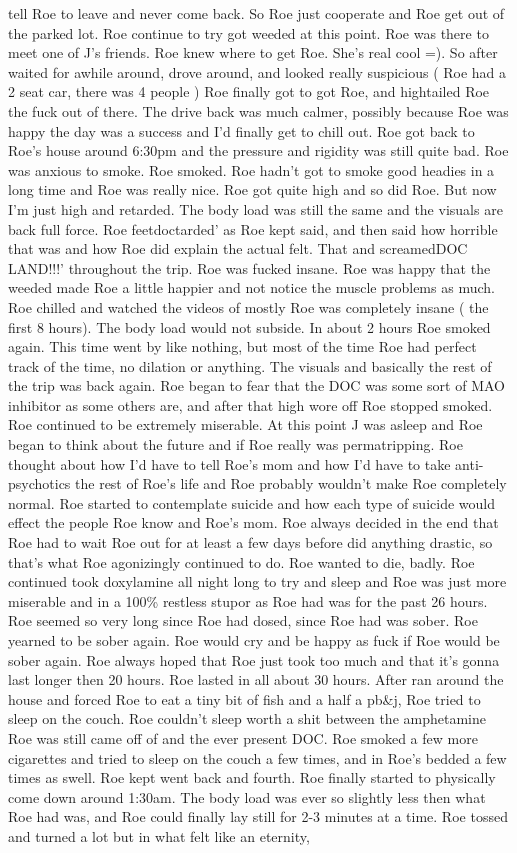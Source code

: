 \documentclass[12pt]{book}
\begin{document}
tell Roe to leave and never come back. So Roe just cooperate and Roe get out of the parked lot. Roe continue to try got weeded at this point. Roe was there to meet one of J's friends. Roe knew where to get Roe. She's real cool =). So after waited for awhile around, drove around, and looked really suspicious ( Roe had a 2 seat car, there was 4 people ) Roe finally got to got Roe, and hightailed Roe the fuck out of there. The drive back was much calmer, possibly because Roe was happy the day was a success and I'd finally get to chill out. Roe got back to Roe's house around 6:30pm and the pressure and rigidity was still quite bad. Roe was anxious to smoke. Roe smoked. Roe hadn't got to smoke good headies in a long time and Roe was really nice. Roe got quite high and so did Roe. But now I'm just high and retarded. The body load was still the same and the visuals are back full force. Roe feetdoctarded' as Roe kept said, and then said how horrible that was and how Roe did explain the actual felt. That and screamedDOC LAND!!!' throughout the trip. Roe was fucked insane. Roe was happy that the weeded made Roe a little happier and not notice the muscle problems as much. Roe chilled and watched the videos of mostly Roe was completely insane ( the first 8 hours). The body load would not subside. In about 2 hours Roe smoked again. This time went by like nothing, but most of the time Roe had perfect track of the time, no dilation or anything. The visuals and basically the rest of the trip was back again. Roe began to fear that the DOC was some sort of MAO inhibitor as some others are, and after that high wore off Roe stopped smoked. Roe continued to be extremely miserable. At this point J was asleep and Roe began to think about the future and if Roe really was permatripping. Roe thought about how I'd have to tell Roe's mom and how I'd have to take anti-psychotics the rest of Roe's life and Roe probably wouldn't make Roe completely normal. Roe started to contemplate suicide and how each type of suicide would effect the people Roe know and Roe's mom. Roe always decided in the end that Roe had to wait Roe out for at least a few days before did anything drastic, so that's what Roe agonizingly continued to do. Roe wanted to die, badly. Roe continued took doxylamine all night long to try and sleep and Roe was just more miserable and in a 100\% restless stupor as Roe had was for the past 26 hours. Roe seemed so very long since Roe had dosed, since Roe had was sober. Roe yearned to be sober again. Roe would cry and be happy as fuck if Roe would be sober again. Roe always hoped that Roe just took too much and that it's gonna last longer then 20 hours. Roe lasted in all about 30 hours. After ran around the house and forced Roe to eat a tiny bit of fish and a half a pb\&j, Roe tried to sleep on the couch. Roe couldn't sleep worth a shit between the amphetamine Roe was still came off of and the ever present DOC. Roe smoked a few more cigarettes and tried to sleep on the couch a few times, and in Roe's bedded a few times as swell. Roe kept went back and fourth. Roe finally started to physically come down around 1:30am. The body load was ever so slightly less then what Roe had was, and Roe could finally lay still for 2-3 minutes at a time. Roe tossed and turned a lot but in what felt like an eternity, 
\end{document}
